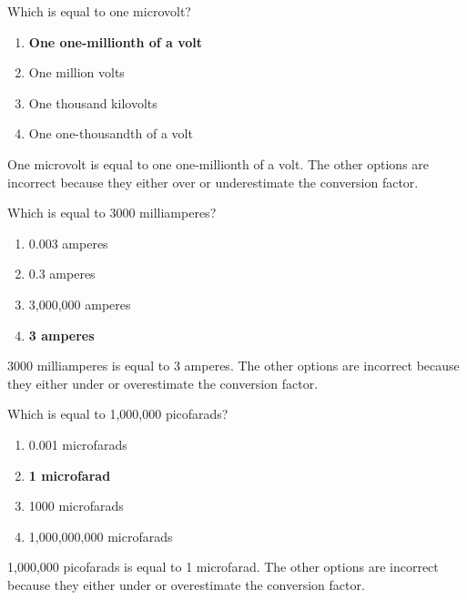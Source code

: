 \begin{tcolorbox}[colback=gray!10!white,colframe=black!75!black,title={T5B04}]
    Which is equal to one microvolt?
    \begin{enumerate}[label=\Alph*),noitemsep]
        \item \textbf{One one-millionth of a volt}
        \item One million volts
        \item One thousand kilovolts
        \item One one-thousandth of a volt
    \end{enumerate}
\end{tcolorbox}
One microvolt is equal to one one-millionth of a volt. The other options are incorrect because they either over or underestimate the conversion factor.


\begin{tcolorbox}[colback=gray!10!white,colframe=black!75!black,title={T5B06}]
    Which is equal to 3000 milliamperes?
    \begin{enumerate}[label=\Alph*),noitemsep]
        \item 0.003 amperes
        \item 0.3 amperes
        \item 3,000,000 amperes
        \item \textbf{3 amperes}
    \end{enumerate}
\end{tcolorbox}
3000 milliamperes is equal to 3 amperes. The other options are incorrect because they either under or overestimate the conversion factor.


\begin{tcolorbox}[colback=gray!10!white,colframe=black!75!black,title={T5B08}]
    Which is equal to 1,000,000 picofarads?
    \begin{enumerate}[label=\Alph*),noitemsep]
        \item 0.001 microfarads
        \item \textbf{1 microfarad}
        \item 1000 microfarads
        \item 1,000,000,000 microfarads
    \end{enumerate}
\end{tcolorbox}
1,000,000 picofarads is equal to 1 microfarad. The other options are incorrect because they either under or overestimate the conversion factor.

